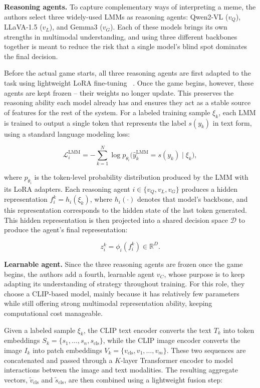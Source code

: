 \documentclass[manuscript,review]{acmart}
\begin{document}
\textbf{Reasoning agents.} To capture complementary ways of interpreting a meme, the
authors select three widely-used LMMs as reasoning agents: Qwen2-VL ($v_Q$), LLaVA-1.5
($v_L$), and Gemma3 ($v_G$). Each of these models brings its own strengths in multimodal
understanding, and using three different backbones together is meant to reduce the risk
that a single model's blind spot dominates the final decision.

Before the actual game starts, all three reasoning agents are first adapted to the task
using lightweight LoRA fine-tuning ~\cite{hu2022lora}. Once the game begins, however, these agents are kept
frozen -- their weights no longer update. This preserves the reasoning ability each model
already has and ensures they act as a stable source of features for the rest of the
system. For a labeled training sample $\xi_k$, each LMM is trained to output a single
token that represents the label $s(y_k)$ in text form, using a standard language modeling
loss:

\begin{equation}
\mathcal{L}_i^{\text{LMM}} = -\sum_{k=1}^{N} \log p_{\theta_i}\big(\hat{y}_k^{\text{LMM}} = s(y_k) \mid \xi_k\big),
\end{equation}

where $p_{\theta_i}$ is the token-level probability distribution produced by the LMM with
its LoRA adapters. Each reasoning agent $i \in \{v_Q, v_L, v_G\}$ produces a hidden
representation $f_i^k = h_i(\xi_k)$, where $h_i(\cdot)$ denotes that model's backbone, and
this representation corresponds to the hidden state of the last token generated. This
hidden representation is then projected into a shared decision space $\mathcal{D}$ to
produce the agent's final representation:

\begin{equation}
z_i^k = \phi_i(f_i^k) \in \mathbb{R}^D.
\end{equation}

\textbf{Learnable agent.} Since the three reasoning agents are frozen once the game
begins, the authors add a fourth, learnable agent $v_C$, whose purpose is to keep
adapting its understanding of strategy throughout training. For this role, they choose a
CLIP-based model, mainly because it has relatively few parameters while still offering
strong multimodal representation ability, keeping computational cost manageable.

Given a labeled sample $\xi_k$, the CLIP text encoder converts the text $T_k$ into token
embeddings $S_k = \{s_1, \dots, s_n, s_{\text{cls}}\}$, while the CLIP image encoder
converts the image $I_k$ into patch embeddings $V_k = \{v_{\text{cls}}, v_1, \dots,
v_m\}$. These two sequences are concatenated and passed through a $K$-layer Transformer
encoder to model interactions between the image and text modalities. The resulting
aggregate vectors, $\tilde{v}_{\text{cls}}$ and $\tilde{s}_{\text{cls}}$, are then combined
using a lightweight fusion step:
\end{document}
